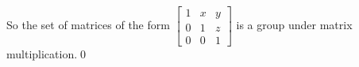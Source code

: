 \documentclass{article}
\begin{document}
\begin{description}
\begin{description}
		\end{description} So the set of matrices of the form $\left[\begin{smallmatrix}
		1	&x	&y\\
		0	&1	&z\\
		0	&0	&1
		\end{smallmatrix}\right]$ is a group under matrix multiplication.\qed
	\end{description}
\end{document}
